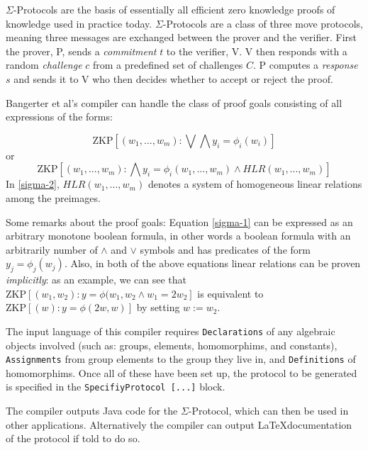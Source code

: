 \documentclass{sig-alternate}
\begin{document}
		$\Sigma$-Protocols are the basis of essentially all efficient zero knowledge
		proofs of knowledge used in practice today. $\Sigma$-Protocols are a class of
		three move protocols, meaning three messages are exchanged between the prover
		and the verifier. First the prover, P, sends a \textit{commitment} $t$ to the
		verifier, V. V then responds with a random \textit{challenge} $c$ from a 
		predefined set of challenges $C$. P computes a \textit{response} $s$ and sends
		it to V who then decides whether to accept or reject the proof.
		
		Bangerter et al's compiler can handle the class of proof goals consisting of
		all expressions of the forms:
		
		\begin{equation}\label{sigma-1}
		\text{ZKP}[(w_{1},...,w_{m}):\bigvee\bigwedge y_{i} = \phi_{i}(w_{i})]
		\end{equation}
		or
		\begin{equation}\label{sigma-2}
		\text{ZKP}[(w_{1},...,w_{m}):\bigwedge y_{i} = \phi_{i}(w_{1},...,w_{m})\land HLR(w_{1},...,w_{m})]
		\end{equation}
		In \eqref{sigma-2}, $HLR(w_{1},...,w_{m})$ denotes a system of homogeneous linear
		relations among the preimages.
		
		Some remarks about the proof goals: Equation \eqref{sigma-1} can be expressed
		as an arbitrary monotone boolean formula, in other words a boolean formula
		with an arbitrarily number of $\land$ and $\lor$ symbols and has predicates of
		the form $y_{j} = \phi_{j}(w_{j}).$ Also, in both of the above equations
		linear relations can be proven \textit{implicitly}: as an example, we can
		see that $\text{ZKP}[(w_{1},w_{2}):y = \phi(w_{1},w_{2} \land w_{1} = 2w_{2}]$
		is equivalent to $\text{ZKP}[(w):y = \phi(2w,w)]$ by setting $w:=w_{2}$.
		
		The input language of this compiler requires \texttt{Declarations} of any
		algebraic objects involved (such as: groups, elements, homomorphims, and
		constants), \texttt{Assignments} from group elements to the group
		they live in, and \texttt{Definitions} of homomorphims. Once all of these
		have been set up, the protocol to be generated is specified in the
		\texttt{SpecifiyProtocol [...]} block.
		
		The compiler outputs Java code for the $\Sigma$-Protocol, which
		can then be used in other applications. Alternatively the compiler
		can output \LaTeX documentation of the protocol if told to do so.
		
\end{document}
